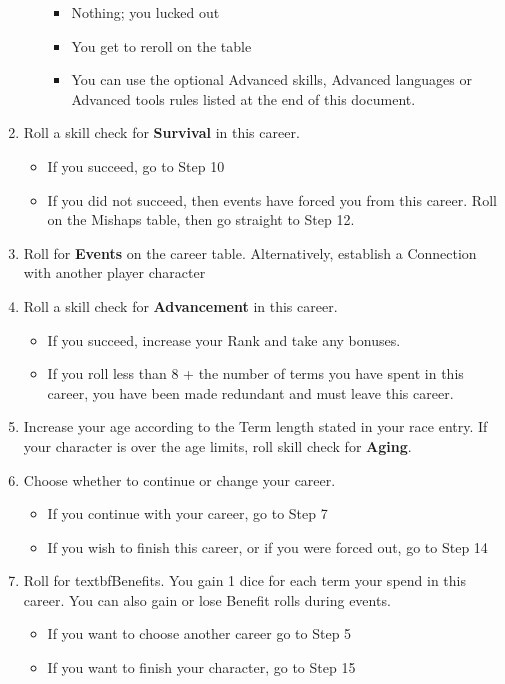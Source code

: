 \documentclass[10pt,twoside]{article}
\begin{document}
\begin{multicols}{2}
\begin{enumerate}
\begin{itemize}
\begin{itemize}
\item Nothing; you lucked out
\item You get to reroll on the table
\item You can use the optional Advanced skills, Advanced languages or Advanced tools rules listed at the end of this document.
\end{itemize}
\end{itemize}
\item Roll a skill check for \textbf{Survival} in this career.
\begin{itemize}
\item If you succeed, go to Step 10
\item If you did not succeed, then events have forced you from this career. Roll on the Mishaps table, then go straight to Step 12.
\end{itemize}
\item Roll for \textbf{Events} on the career table. Alternatively, establish a Connection with another player character
\item Roll a skill check for \textbf{Advancement} in this career.
\begin{itemize}
\item If you succeed, increase your Rank and take any bonuses.
\item If you roll less than 8 + the number of terms you have spent in this career, you have been made redundant and must leave this career.
\end{itemize}
\item Increase your age according to the Term length stated in your race entry. If your character is over the age limits, roll skill check for \textbf{Aging}.
\item Choose whether to continue or change your career.
\begin{itemize}
\item If you continue with your career, go to Step 7
\item If you wish to finish this career, or if you were forced out, go to Step 14
\end{itemize}
\item Roll for textbf{Benefits}. You gain 1 dice for each term your spend in this career. You can also gain or lose Benefit rolls during events.
\begin{itemize}
\item If you want to choose another career go to Step 5
\item If you want to finish your character, go to Step 15

\end{itemize}
\end{enumerate}
\end{multicols}
\end{document}
